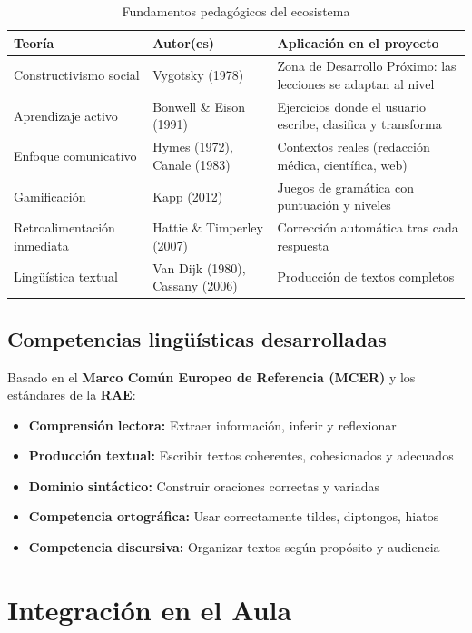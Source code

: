 \documentclass[12pt,spanish]{article}
\begin{document}
\begin{table}[H]
\centering
\caption{Fundamentos pedagógicos del ecosistema}
\label{tab:pedagogia}
\begin{tabular}{|p{3.5cm}|p{4cm}|p{6cm}|}
\hline
\textbf{Teoría} & \textbf{Autor(es)} & \textbf{Aplicación en el proyecto} \\
\hline
Constructivismo social & Vygotsky (1978) & Zona de Desarrollo Próximo: las lecciones se adaptan al nivel \\
\hline
Aprendizaje activo & Bonwell \& Eison (1991) & Ejercicios donde el usuario escribe, clasifica y transforma \\
\hline
Enfoque comunicativo & Hymes (1972), Canale (1983) & Contextos reales (redacción médica, científica, web) \\
\hline
Gamificación & Kapp (2012) & Juegos de gramática con puntuación y niveles \\
\hline
Retroalimentación inmediata & Hattie \& Timperley (2007) & Corrección automática tras cada respuesta \\
\hline
Lingüística textual & Van Dijk (1980), Cassany (2006) & Producción de textos completos \\
\hline
\end{tabular}
\end{table}

\subsection{Competencias lingüísticas desarrolladas}

Basado en el \textbf{Marco Común Europeo de Referencia (MCER)} y los estándares de la \textbf{RAE}:

\begin{itemize}
    \item \textbf{Comprensión lectora:} Extraer información, inferir y reflexionar
    \item \textbf{Producción textual:} Escribir textos coherentes, cohesionados y adecuados
    \item \textbf{Dominio sintáctico:} Construir oraciones correctas y variadas
    \item \textbf{Competencia ortográfica:} Usar correctamente tildes, diptongos, hiatos
    \item \textbf{Competencia discursiva:} Organizar textos según propósito y audiencia
\end{itemize}

\section{Integración en el Aula}
\end{document}
